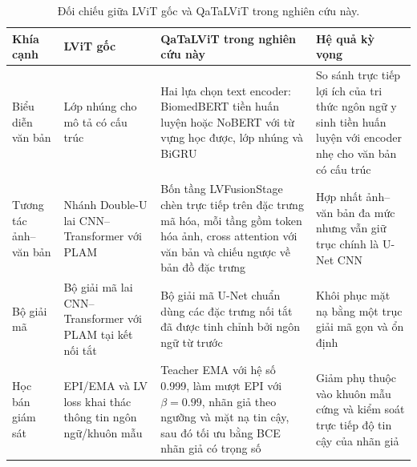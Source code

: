 \begin{table}[!t]
  \centering
  \caption{Đối chiếu giữa LViT gốc và QaTaLViT trong nghiên cứu này.}
  \label{tab:lvit-to-qatalvit}
  \scriptsize
  \renewcommand{\arraystretch}{1.16}
  \setlength{\tabcolsep}{4pt}
  \begin{tabularx}{\textwidth}{@{}l L L L@{}}
    \toprule
    Khía cạnh & LViT gốc \cite{li2023lvit} & QaTaLViT trong nghiên cứu này & Hệ quả kỳ vọng \\
    \midrule
    Biểu diễn văn bản & Lớp nhúng cho mô tả có cấu trúc & Hai lựa chọn text encoder: BiomedBERT tiền huấn luyện hoặc NoBERT với từ vựng học được, lớp nhúng và BiGRU & So sánh trực tiếp lợi ích của tri thức ngôn ngữ y sinh tiền huấn luyện với encoder nhẹ cho văn bản có cấu trúc \\
    Tương tác ảnh--văn bản & Nhánh Double-U lai CNN--Transformer với PLAM & Bốn tầng LVFusionStage chèn trực tiếp trên đặc trưng mã hóa, mỗi tầng gồm token hóa ảnh, cross attention với văn bản và chiếu ngược về bản đồ đặc trưng & Hợp nhất ảnh--văn bản đa mức nhưng vẫn giữ trục chính là U-Net CNN \\
    Bộ giải mã & Bộ giải mã lai CNN--Transformer với PLAM tại kết nối tắt & Bộ giải mã U-Net chuẩn dùng các đặc trưng nối tắt đã được tinh chỉnh bởi ngôn ngữ từ trước & Khôi phục mặt nạ bằng một trục giải mã gọn và ổn định \\
    Học bán giám sát & EPI/EMA và LV loss khai thác thông tin ngôn ngữ/khuôn mẫu & Teacher EMA với hệ số 0.999, làm mượt EPI với \(\beta=0.99\), nhãn giả theo ngưỡng và mặt nạ tin cậy, sau đó tối ưu bằng BCE nhãn giả có trọng số & Giảm phụ thuộc vào khuôn mẫu cứng và kiểm soát trực tiếp độ tin cậy của nhãn giả \\
    \bottomrule
  \end{tabularx}
\end{table}

